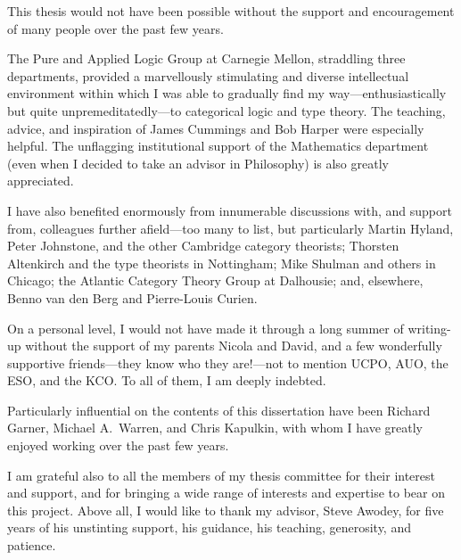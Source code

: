 This thesis would not have been possible without the support and encouragement of many people over the past few years.

The Pure and Applied Logic Group at Carnegie Mellon, straddling three departments, provided a marvellously stimulating and diverse intellectual environment within which I was able to gradually find my way---enthusiastically but quite unpremeditatedly---to categorical logic and type theory.  The teaching, advice, and inspiration of James Cummings and Bob Harper were especially helpful.  The unflagging institutional support of the Mathematics department (even when I decided to take an advisor in Philosophy) is also greatly appreciated.

I have also benefited enormously from innumerable discussions with, and support from, colleagues further afield---too many to list, but particularly Martin Hyland, Peter Johnstone, and the other Cambridge category theorists; Thorsten Altenkirch and the type theorists in Nottingham; Mike Shulman and others in Chicago; the Atlantic Category Theory Group at Dalhousie; and, elsewhere, Benno van den Berg and Pierre-Louis Curien.

On a personal level, I would not have made it through a long summer of writing-up without the support of my parents Nicola and David, and a few wonderfully supportive friends---they know who they are!---not to mention UCPO, AUO, the ESO, and the KCO.  To all of them, I am deeply indebted.

Particularly influential on the contents of this dissertation have been Richard Garner, Michael A.~Warren, and Chris Kapulkin, with whom I have greatly enjoyed working over the past few years.

I am grateful also to all the members of my thesis committee for their interest and support, and for bringing a wide range of interests and expertise to bear on this project.  Above all, I would like to thank my advisor, Steve Awodey, for five years of his unstinting support, his guidance, his teaching, generosity, and patience. %